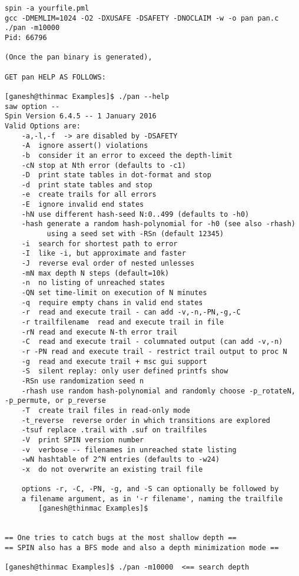 \documentclass[11pt]{article}
\begin{document}
\begin{scriptsize}
\begin{verbatim}
spin -a yourfile.pml
gcc -DMEMLIM=1024 -O2 -DXUSAFE -DSAFETY -DNOCLAIM -w -o pan pan.c
./pan -m10000 
Pid: 66796

(Once the pan binary is generated),

GET pan HELP AS FOLLOWS:

[ganesh@thinmac Examples]$ ./pan --help
saw option --
Spin Version 6.4.5 -- 1 January 2016
Valid Options are:
	-a,-l,-f  -> are disabled by -DSAFETY
	-A  ignore assert() violations
	-b  consider it an error to exceed the depth-limit
	-cN stop at Nth error (defaults to -c1)
	-D  print state tables in dot-format and stop
	-d  print state tables and stop
	-e  create trails for all errors
	-E  ignore invalid end states
	-hN use different hash-seed N:0..499 (defaults to -h0)
	-hash generate a random hash-polynomial for -h0 (see also -rhash)
	      using a seed set with -RSn (default 12345)
	-i  search for shortest path to error
	-I  like -i, but approximate and faster
	-J  reverse eval order of nested unlesses
	-mN max depth N steps (default=10k)
	-n  no listing of unreached states
	-QN set time-limit on execution of N minutes
	-q  require empty chans in valid end states
	-r  read and execute trail - can add -v,-n,-PN,-g,-C
	-r trailfilename  read and execute trail in file
	-rN read and execute N-th error trail
	-C  read and execute trail - columnated output (can add -v,-n)
	-r -PN read and execute trail - restrict trail output to proc N
	-g  read and execute trail + msc gui support
	-S  silent replay: only user defined printfs show
	-RSn use randomization seed n
	-rhash use random hash-polynomial and randomly choose -p_rotateN, -p_permute, or p_reverse
	-T  create trail files in read-only mode
	-t_reverse  reverse order in which transitions are explored
	-tsuf replace .trail with .suf on trailfiles
	-V  print SPIN version number
	-v  verbose -- filenames in unreached state listing
	-wN hashtable of 2^N entries (defaults to -w24)
	-x  do not overwrite an existing trail file

	options -r, -C, -PN, -g, and -S can optionally be followed by
	a filename argument, as in '-r filename', naming the trailfile
        [ganesh@thinmac Examples]$


== One tries to catch bugs at the most shallow depth ==
== SPIN also has a BFS mode and also a depth minimization mode ==

[ganesh@thinmac Examples]$ ./pan -m10000  <== search depth 


\end{verbatim}
\end{scriptsize}
\end{document}
